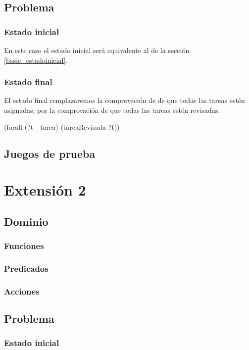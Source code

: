 \documentclass[12pt]{article}
\begin{document}
\subsection{Problema}
\subsubsection{Estado inicial}

En este caso el estado inicial serà equivalente al de la sección \ref{basic_estadoinicial}.

\subsubsection{Estado final}

El estado final remplazaremos la comprovación de de que todas las tareas estén asignadas, por la comprovación de que todas las tareas estén revisadas.

(forall (?t - tarea) (tareaRevisada ?t))

\subsection{Juegos de prueba}



\section{Extensión 2}

\subsection{Dominio}
\subsubsection{Funciones}
\subsubsection{Predicados}
\subsubsection{Acciones}

\subsection{Problema}
\subsubsection{Estado inicial}
\end{document}
